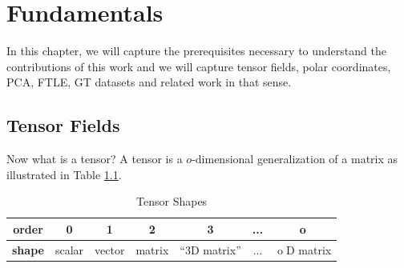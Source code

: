 \documentclass{scrartcl}
\begin{document}
\chapter{Fundamentals}
\label{chap:grundlagen}

In this chapter, we will capture the prerequisites necessary to understand the contributions of this work and we will capture tensor fields, polar coordinates, PCA, FTLE, GT datasets and related work in that sense.


\section{Tensor Fields}
\label{sec:tensors}
Now what is a tensor? A tensor is a $o$-dimensional generalization of a matrix as illustrated in Table \ref{tensor}.
\begin{table}[!b]
\centering
\caption{Tensor Shapes}
 \begin{tabular}{c|c|c|c|c|c|c}
\textbf{order} & 0 & 1 & 2 & 3 & ... & o \\ 
\hline 
\textbf{shape} & scalar & vector & matrix & ``3D matrix'' & ... & $\mathop{o}$D matrix\\ 
\end{tabular}
\label{tensor}
 \end{table} 
\end{document}
